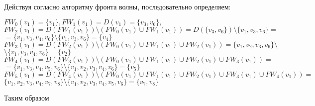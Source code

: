 \documentclass[12pt, letterpaper, titlepage]{article}
\begin{document}
Действуя согласно алгоритму фронта волны, последовательно определяем:

$FW_0(v_1)=\{v_1\}, FW_1(v_1)=D(v_1)=\{v_3,v_6\},$\\
$FW_2(v_1)=D(FW_1(v_1)) \setminus (FW_0(v_1) \cup FW_1(v_1))=D(\{v_3,v_6\}) \setminus \{v_1,v_3,v_6\}=$\\
$=\{v_1,v_3,v_4,v_6\} \setminus \{v_1,v_3,v_6\}=\{v_4\}$\\
$FW_3(v_1)=D(FW_2(v_1)) \setminus (FW_0(v_1)\cup FW_1(v_1)\cup FW_2(v_1))=\{v_1,v_2,v_3,v_6\} \setminus$\\
$\setminus \{v_1,v_3,v_4,v_6\}=\{v_2\}$\\
$FW_4(v_1)=D(FW_3(v_1)) \setminus (FW_0(v_1)\cup FW_1(v_1)\cup FW_2(v_1)\cup FW_3(v_1))=$\\
$=\{v_1,v_3,v_4,v_5,v_6\} \setminus \{v_1,v_2,v_3,v_4,v_6\}=\{v_5\}$\\
$FW_5(v_1)=D(FW_4(v_1)) \setminus (FW_0(v_1)\cup FW_1(v_1)\cup FW_2(v_1)\cup FW_3(v_1)\cup FW_4(v_1))=$\\
$\{v_1,v_2,v_3,v_4,v_7,v_8\}\setminus \{v_1,v_2,v_3,v_4,v_5,v_6\}=\{v_7,v_8\}$

Таким образом
\end{document}
